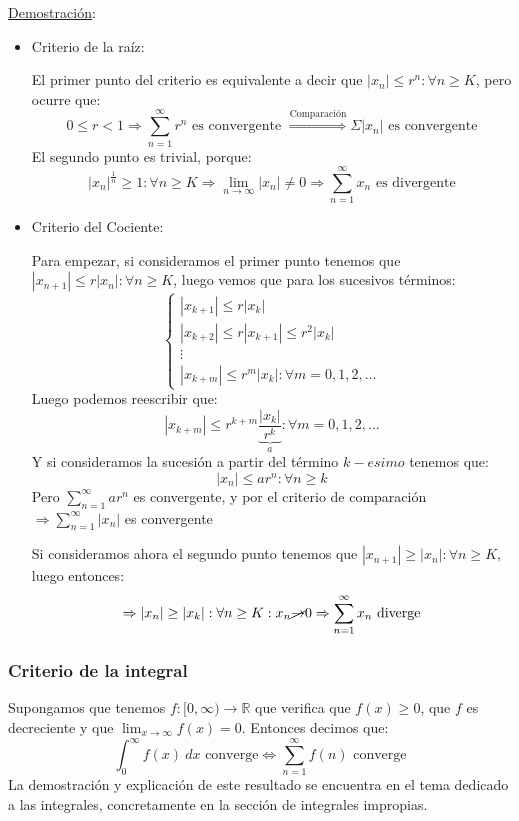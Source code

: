 \documentclass[10pt,a4paper,openright]{book}
\begin{document}
\underline{Demostración}:
\begin{itemize}
\item Criterio de la raíz:

El primer punto del criterio es equivalente a decir que $|x_n| \leq r^n : \forall n \geq K$, pero ocurre que:
$$0 \leq r < 1 \Rightarrow \sum_{n=1}^{\infty} r^n \mbox{ es convergente }\overset{\mbox{Comparación}}{\Rightarrow} \Sigma |x_n| \mbox{ es convergente}$$
El segundo punto es trivial, porque:
$$|x_n|^{\frac{1}{n}} \geq 1 : \forall n \geq K \Rightarrow \lim_{n \to  \infty} |x_n| \neq 0 \Rightarrow \sum_{n=1}^\infty x_n \mbox{ es divergente}$$

\item Criterio del Cociente:

Para empezar, si consideramos el primer punto tenemos que $ |x_{n+1} | \leq r |x_n|: \forall n \geq K $, luego vemos que para los sucesivos términos:
$$\begin{cases}|x_{k+1}| \leq r |x_k| \\ |x_{k+2}|\leq r |x_{k+1}| \leq r^2 |x_k| \\ \vdots \\ |x_{k+m}| \leq r^m |x_k| : \forall m = 0,1,2,\ldots \end{cases}$$
Luego podemos reescribir que:
$$|x_{k+m}| \leq r^{k+m} \underbrace{\frac{|x_k|}{r^k}}_a : \forall m = 0,1,2,\ldots$$
Y si consideramos la sucesión a partir del término $k-esimo$ tenemos que:
$$|x_n| \leq a r^n : \forall n \geq k$$
Pero $\sum_{n=1}^{\infty} a r^n$ es convergente, y por el criterio de comparación $\Rightarrow \sum_{n=1}^{\infty} |x_n|$ es convergente

Si consideramos ahora el segundo punto tenemos que $|x_{n+1}| \geq |x_n|: \forall n \geq K $, luego entonces:
$$\Rightarrow |x_n| \geq |x_k|: \forall n \geq K: x_n \cancel{\rightarrow} 0 \Rightarrow  \sum_{n=1}^\infty x_n \mbox{ diverge}$$
\end{itemize}

\subsubsection*{Criterio de la integral}
Supongamos que tenemos $f:[0, \infty)\rightarrow \mathbb R$ que verifica que $f(x)\geq 0 $, que $f$ es decreciente y que $\lim_{x \rightarrow \infty} f(x) = 0$. Entonces decimos que:
$$\int_{0}^{\infty} f(x)\ dx \mbox{ converge} \Leftrightarrow \sum_{n = 1 }^{\infty} f(n)\mbox{ converge}$$
La demostración y explicación de este resultado se encuentra en el tema dedicado a las integrales, concretamente en la sección de integrales impropias.
\end{document}
